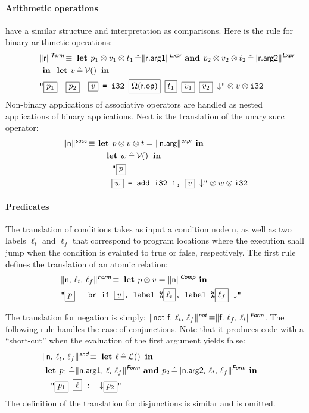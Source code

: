 \documentclass{llncs}
\newcommand{\trad}[2]{\ensuremath{\lVert \textsf{#1} \rVert^{\textit{#2}}}}
\newcommand{\nl}[0]{\ensuremath{\downarrow}}
\DeclareMathOperator{\isdef}{\equiv}
\DeclareMathOperator{\lbl}{\mathcal{L}()}
\DeclareMathOperator{\variable}{\mathcal{V}()}
\newcommand{\llvm}[1]{\texttt{#1}}
\newcommand{\B}[1]{\textsf{#1}}
\newcommand{\LET}[0]{\textbf{ let }}
\DeclareMathOperator{\BE}{\hat{=}}
\newcommand{\IN}[0]{\textbf{ in }}
\newcommand{\AND}[0]{\textbf{ and }}
\newcommand{\PH}[1]{\framebox{$#1$}}
\newcommand{\sep}[0]{\otimes}
\newcommand{\opmap}[0]{\ensuremath{\sf\Omega}}
\begin{document}
\paragraph{Arithmetic operations} have a similar
structure and interpretation as comparisons. Here is the rule for binary
arithmetic operations:
\begin{align*}
\lefteqn{\trad{r}{\B{Term}} \isdef
  \LET
  p_1 \sep v_1 \sep t_1 \BE \trad{r.arg1}{\B{Expr}} \AND
  p_2 \sep v_2 \sep t_2 \BE \trad{r.arg2}{\B{Expr}}} \\
& \IN \LET v \BE \variable \IN \\
& \llvm{"\PH{p_1}\quad\PH{p_2}\quad\PH{v} = i32 \PH{\opmap(\B{r.op})} \PH{t_1} \PH{v_1} \PH{v_2} \nl"} \sep v \sep \llvm{i32}
\end{align*}
Non-binary applications of associative operators are handled as nested
applications of binary applications. Next is the translation of the unary
\B{succ} operator:
\begin{align*}
  \trad{n}{\B{succ}} \isdef & \textbf{ let } p \sep v \sep t = \trad{n.arg}{\B{expr}} \IN  \\
  & \quad \LET w \BE \variable \IN \\
  & \quad \quad \llvm{"\PH{p}} \\
  & \quad \quad \llvm{\PH{w} = add i32 1, \PH{v} \nl"} \sep w \sep \llvm{i32}
\end{align*}

\paragraph{Predicates}
The translation of conditions takes as input a condition node \B{n}, as well as
two labels $\ell_t$ and $\ell_f$ that correspond to program locations where the
execution shall jump when the condition is evaluted to true or false,
respectively.  The first rule defines the translation of an atomic relation:
\begin{align*}
  \lefteqn{\trad{n, $\ell_t$, $\ell_f$}{\B{Form}} \isdef
  \textbf{ let } p \sep v = \trad{n}{\B{Comp}} \IN} \\
  & \llvm{"\PH{p} \quad br i1 \PH{v}, label \%\PH{\ell_t}, label \%\PH{\ell_f} \nl"}
\end{align*}

\noindent The translation for negation is simply: $\trad{not f, $\ell_t$,
  $\ell_f$}{\B{not}} \isdef \trad{f, $\ell_f$, $\ell_t$}{\B{Form}}$.  The
following rule handles the case of conjunctions. Note that it produces code with
a ``short-cut'' when the evaluation of the first argument yields false:
\begin{align*}
\begin{split}
  \lefteqn{\trad{n, $\ell_t$, $\ell_f$}{\B{and}} \isdef \LET \ell \BE \lbl \IN} \\
  & \LET p_1 \BE \trad{n.arg1, $\ell$, $\ell_f$}{\B{Form}}
  \AND p_2 \BE \trad{n.arg2, $\ell_t$, $\ell_f$}{\B{Form}} \IN \\
  & \quad \llvm{"\PH{p_1} \PH{\ell} :  \nl \PH{p_2}"}
\end{split}
\end{align*}
The definition of the translation for disjunctions is similar and is omitted.
\end{document}
